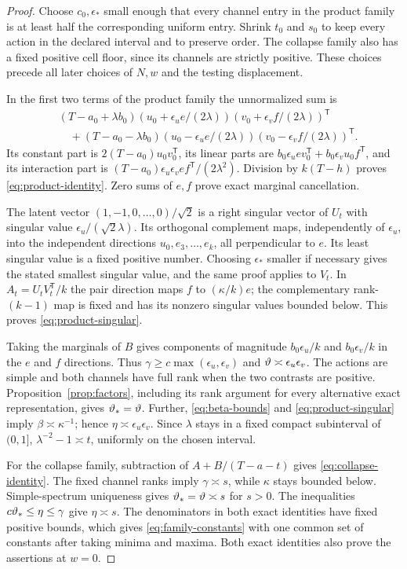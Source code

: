 \begin{proof}
Choose $c_0,\epsilon_*$ small enough that every channel entry in the
product family is at least half the corresponding uniform entry.
Shrink $t_0$ and $s_0$ to keep every action in the declared interval
and to preserve order. The collapse family also has a fixed positive
cell floor, since its channels are strictly positive. These choices
precede all later choices of $N,w$ and the testing displacement.

In the first two terms of the product family the unnormalized sum is
\begin{align*}
 &(T-a_0+\lambda b_0)
       (u_0+\epsilon_ue/(2\lambda))(v_0+\epsilon_vf/(2\lambda))^{\mathsf T}\\
 &\quad +(T-a_0-\lambda b_0)
       (u_0-\epsilon_ue/(2\lambda))(v_0-\epsilon_vf/(2\lambda))^{\mathsf T}.
\end{align*}
Its constant part is $2(T-a_0)u_0v_0^{\mathsf T}$, its linear parts
are $b_0\epsilon_u ev_0^{\mathsf T}+b_0\epsilon_vu_0f^{\mathsf T}$,
and its interaction part is
$(T-a_0)\epsilon_u\epsilon_v ef^{\mathsf T}/(2\lambda^2)$.
Division by $k(T-h)$ proves \eqref{eq:product-identity}. Zero sums
of $e,f$ prove exact marginal cancellation.

The latent vector $(1,-1,0,\ldots,0)/\sqrt2$ is a right singular
vector of $U_t$ with singular value $\epsilon_u/(\sqrt2\lambda)$.
Its orthogonal complement maps, independently of $\epsilon_u$, into
the independent directions $u_0,e_3,\ldots,e_k$, all perpendicular to
$e$. Its least singular value is a fixed positive number. Choosing
$\epsilon_*$ smaller if necessary gives the stated smallest singular
value, and the same proof applies to $V_t$. In $A_t=U_tV_t^{\mathsf T}/k$
the pair direction maps $f$ to $(\kappa/k)e$; the complementary
rank-$(k-1)$ map is fixed and has its nonzero singular values bounded
below. This proves \eqref{eq:product-singular}.

Taking the marginals of $B$ gives components of magnitude
$b_0\epsilon_u/k$ and $b_0\epsilon_v/k$ in the $e$ and $f$
directions. Thus $\gamma\ge c\max(\epsilon_u,\epsilon_v)$ and
$\vartheta\asymp\epsilon_u\epsilon_v$. The actions are simple and both
channels have full rank when the two contrasts are positive.
Proposition~\ref{prop:factors}, including its rank argument for every
alternative exact representation, gives $\vartheta_* =\vartheta$.
Further, \eqref{eq:beta-bounds} and \eqref{eq:product-singular} imply
$\beta\asymp\kappa^{-1}$; hence $\eta\asymp\epsilon_u\epsilon_v$.
Since $\lambda$ stays in a fixed compact subinterval of $(0,1]$,
$\lambda^{-2}-1\asymp t$, uniformly on the chosen interval.

For the collapse family, subtraction of $A+B/(T-a-t)$ gives
\eqref{eq:collapse-identity}. The fixed channel ranks imply
$\gamma\asymp s$, while $\kappa$ stays bounded below. Simple-spectrum
uniqueness gives $\vartheta_* =\vartheta\asymp s$ for $s>0$.
The inequalities $c\vartheta_*\le\eta\le\gamma$ give $\eta\asymp s$.
The denominators in both exact identities have fixed positive bounds,
which gives \eqref{eq:family-constants} with one common set of
constants after taking minima and maxima. Both exact identities also
prove the assertions at $w=0$.
\end{proof}

